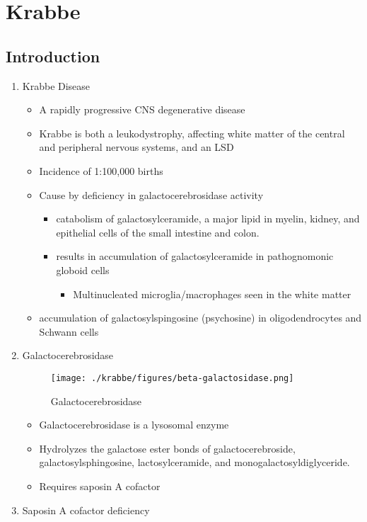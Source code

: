 \documentclass{scrartcl}
\begin{document}
\section{Krabbe}
\label{sec:org618b85d}
\subsection{Introduction}
\label{sec:org40b1de7}
\begin{enumerate}
\item Krabbe Disease
\label{sec:orgf7800cd}
\begin{itemize}
\item A rapidly progressive CNS degenerative disease
\item Krabbe is both a leukodystrophy, affecting white matter of the central
and peripheral nervous systems, and an LSD

\item Incidence of 1:100,000 births
\item Cause by deficiency in galactocerebrosidase activity
\begin{itemize}
\item catabolism of galactosylceramide, a major lipid in myelin, kidney, and epithelial cells of the small intestine and colon.
\item results in accumulation of galactosylceramide in pathognomonic globoid cells
\begin{itemize}
\item Multinucleated microglia/macrophages seen in the white matter
\end{itemize}
\end{itemize}
\item accumulation of galactosylspingosine (psychosine) in oligodendrocytes and Schwann cells
\end{itemize}

\item Galactocerebrosidase
\label{sec:org2f35a18}

\begin{figure}[htbp]
\centering
\texttt{[image: ./krabbe/figures/beta-galactosidase.png]}
\caption{\label{fig:orgc39b284}
Galactocerebrosidase}
\end{figure}

\begin{itemize}
\item Galactocerebrosidase is a lysosomal enzyme
\item Hydrolyzes the galactose ester bonds of galactocerebroside, galactosylsphingosine, lactosylceramide, and monogalactosyldiglyceride.
\item Requires saposin A cofactor
\end{itemize}
\item Saposin A cofactor deficiency
\label{sec:org5f0ba97}


\end{enumerate}
\end{document}
